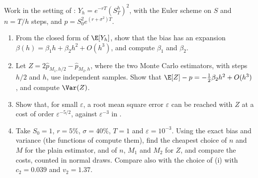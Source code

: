 \begin{exercise}\label{ex:num-richardson}
\medium Work in the setting of : $Y_h=e^{-rT}(S^h_T)^2$, with the Euler scheme on
$S$ and $n=T/h$ steps, and $p=S_0^2e^{(r+\sigma^2)T}$.
\begin{enumerate}[label=(\alph*)]
  \item From the closed form of $\E[Y_h]$, show that the bias has an expansion
    $\beta(h)=\beta_1h+\beta_2h^2+O(h^3)$, and compute $\beta_1$ and $\beta_2$.
  \item Let $Z=2\hat p_{M_1,h/2}-\hat p_{M_2,h}$, where the two Monte Carlo estimators, with steps $h/2$ and
    $h$, use independent samples. Show that $\E[Z]-p=-\frac12\beta_2h^2+O(h^3)$, and compute $\Var(Z)$.
  \item Show that, for small $\varepsilon$, a root mean square error $\varepsilon$ can be reached with $Z$
    at a cost of order $\varepsilon^{-5/2}$, against $\varepsilon^{-3}$ in .
  \item Take $S_0=1$, $r=5\%$, $\sigma=40\%$, $T=1$ and $\varepsilon=10^{-3}$. Using the exact bias and
    variance (the functions of  compute them), find the cheapest
    choice of $n$ and $M$ for the plain estimator, and of $n$, $M_1$ and $M_2$ for $Z$, and compare the
    costs, counted in normal draws. Compare also with the choice of (i) with
    $c_2=0.039$ and $v_2=1.37$.
\end{enumerate}
\end{exercise}

